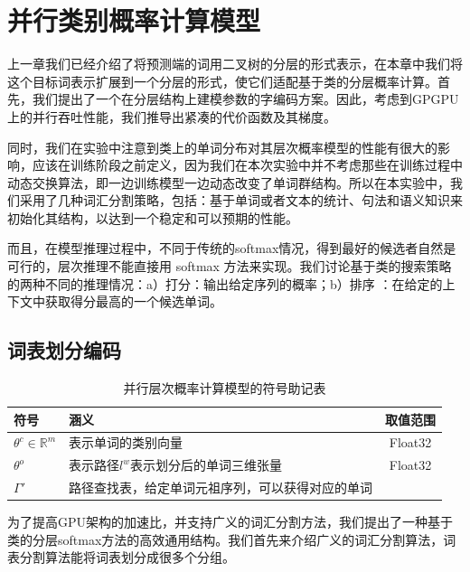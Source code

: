 \chapter{并行类别概率计算模型}
上一章我们已经介绍了将预测端的词用二叉树的分层的形式表示，在本章中我们将这个目标词表示扩展到一个分层的形式，使它们适配基于类的分层概率计算。首先，我们提出了一个在分层结构上建模参数的字编码方案。因此，考虑到GPGPU上的并行吞吐性能，我们推导出紧凑的代价函数及其梯度。

同时，我们在实验中注意到类上的单词分布对其层次概率模型的性能有很大的影响，应该在训练阶段之前定义，因为我们在本次实验中并不考虑那些在训练过程中动态交换算法，即一边训练模型一边动态改变了单词群结构。所以在本实验中，我们采用了几种词汇分割策略，包括：基于单词或者文本的统计、句法和语义知识来初始化其结构，以达到一个稳定和可以预期的性能。

而且，在模型推理过程中，不同于传统的softmax情况，得到最好的候选者自然是可行的，层次推理不能直接用 softmax 方法来实现。我们讨论基于类的搜索策略的两种不同的推理情况：a）打分：输出给定序列的概率；b）排序   ：在给定的上下文中获取得分最高的一个候选单词。


\section{词表划分编码}
\begin{table}[!ht]
  \centering
  \caption{并行层次概率计算模型的符号助记表}
\begin{tabular}{llc}
  \toprule
   符号&涵义&取值范围\\ \midrule
$\theta^c\in\mathbb{R}^m$ &表示单词的类别向量& Float32\\
$ \theta^o$ &表示路径$l^w$表示划分后的单词三维张量&Float32 \\
$\Gamma'$ &路径查找表，给定单词元祖序列，可以获得对应的单词& \\
  \bottomrule
\end{tabular}
\end{table}
为了提高GPU架构的加速比，并支持广义的词汇分割方法，我们提出了一种基于类的分层softmax方法的高效通用结构。我们首先来介绍广义的词汇分割算法，词表分割算法能将词表划分成很多个分组。

